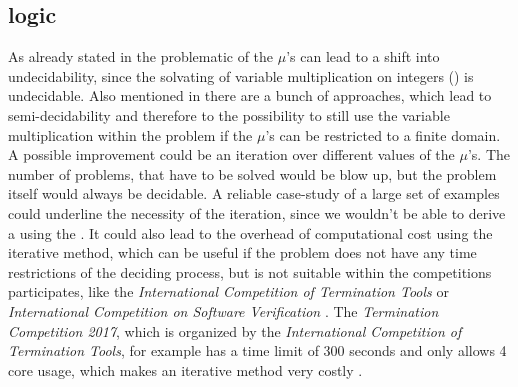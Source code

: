 \subsection{\solver logic}
As already stated in  the problematic of the $\mu$'s can lead to a shift into undecidability, since the solvating of variable multiplication on integers (\qfnia) is undecidable. Also mentioned in  there are a bunch of approaches, which lead to semi-decidability and therefore to the possibility to still use the variable multiplication within the problem if the $\mu$'s can be restricted to a finite domain.\newline
A possible improvement could be an iteration over different values of the $\mu$'s. The number of problems, that have to be solved would be blow up, but the problem itself would always be decidable.\newline
A reliable case-study of a large set of examples could underline the necessity of the iteration, since we wouldn't be able to derive a \gna using the \qfnia. It could also lead to the overhead of computational cost using the iterative method, which can be useful if the problem does not have any time restrictions of the deciding process, but is not suitable within the competitions \aprove participates, like the \textit{International Competition of Termination Tools} or \textit{International Competition on Software Verification} \cite{aproveWebsite} \cite{TermComp} \cite{SVComp}. \newline
The \textit{Termination Competition 2017}, which is organized by the \textit{International Competition of Termination Tools}, for example has a time limit of 300 seconds and only allows 4 core usage, which makes an iterative method very costly \cite{wiki2017termComp}.

